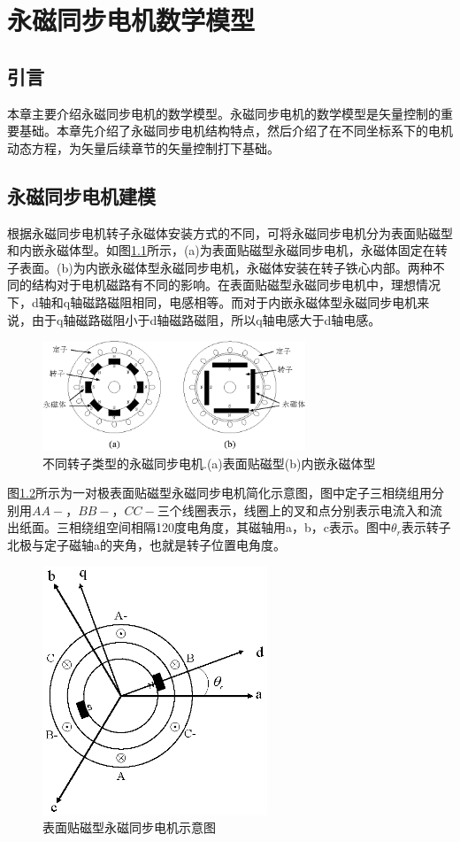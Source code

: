 
\chapter{永磁同步电机数学模型}\label{ch:model}
\section{引言}
本章主要介绍永磁同步电机的数学模型。永磁同步电机的数学模型是矢量控制的重要基础。本章先介绍了永磁同步电机结构特点，然后介绍了在不同坐标系下的电机动态方程，为矢量后续章节的矢量控制打下基础。

\section{永磁同步电机建模}
根据永磁同步电机转子永磁体安装方式的不同，可将永磁同步电机分为表面贴磁型和内嵌永磁体型。如图\ref{fig:motorType}所示，(a)为表面贴磁型永磁同步电机，永磁体固定在转子表面。(b)为内嵌永磁体型永磁同步电机，永磁体安装在转子铁心内部。两种不同的结构对于电机磁路有不同的影响。在表面贴磁型永磁同步电机中，理想情况下，d轴和q轴磁路磁阻相同，电感相等。而对于内嵌永磁体型永磁同步电机来说，由于q轴磁路磁阻小于d轴磁路磁阻，所以q轴电感大于d轴电感。
\begin{figure}[H]
	\centering
	\includegraphics[width=0.7\textwidth]{figs/motor-types.eps}
	\caption{不同转子类型的永磁同步电机.(a)表面贴磁型(b)内嵌永磁体型}
	\label{fig:motorType}
\end{figure}
图\ref{fig:PMSM}所示为一对极表面贴磁型永磁同步电机简化示意图，图中定子三相绕组用分别用$AA-$，$BB-$，$CC-$三个线圈表示，线圈上的叉和点分别表示电流入和流出纸面。三相绕组空间相隔120度电角度，其磁轴用a，b，c表示。图中$\theta_{r}$表示转子北极与定子磁轴a的夹角，也就是转子位置电角度。
\begin{figure}[H]
	\centering
	\includegraphics[width=0.6\textwidth]{figs/PMSM.eps}
	\caption{表面贴磁型永磁同步电机示意图}
	\label{fig:PMSM}
\end{figure}
